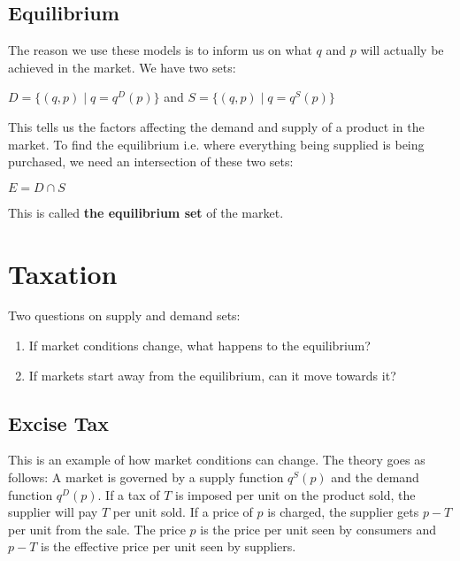 \documentclass[12pt, letterpaper]{article}
\begin{document}
\subsection{Equilibrium}
The reason we use these models is to inform us on what $q$ and $p$ will actually be achieved in the market. We have two sets:
\begin{center}
	$D = \{(q,p) \;|\; q = q^D(p)\}$ and $S = \{(q,p)\;|\; q = q^S(p)\}$
\end{center}
This tells us the factors affecting the demand and supply of a product in the market. To find the equilibrium i.e. where everything being supplied is being purchased, we need an intersection of these two sets:
\begin{center}
	$E = D \cap S$
\end{center}
This is called \textbf{the equilibrium set} of the market.

\section{Taxation}
Two questions on supply and demand sets:
\begin{enumerate}
	\item If market conditions change, what happens to the equilibrium?
	\item If markets start away from the equilibrium, can it move towards it?
\end{enumerate}
\subsection{Excise Tax}
This is an example of how market conditions can change.
The theory goes as follows: A market is governed by a supply function $q^S(p)$ and the demand function $q^D(p)$. If a tax of $T$ is imposed per unit on the product sold, the supplier will pay $T$ per unit sold.
If a price of $p$ is charged, the supplier gets $p-T$ per unit from the sale.
The price $p$ is the price per unit seen by consumers and $p-T$ is the effective price per unit seen by suppliers.
\end{document}
